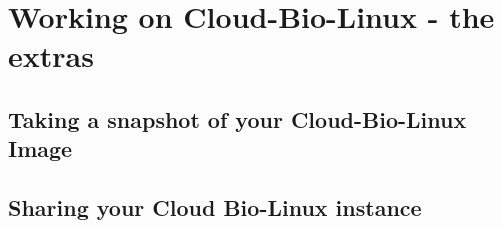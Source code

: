 
\section{Working on Cloud-Bio-Linux - the extras}

\subsection{Taking a snapshot of your Cloud-Bio-Linux Image}
\subsection{Sharing your Cloud Bio-Linux instance}

